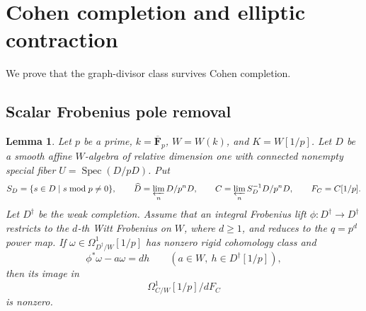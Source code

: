 \documentclass[11pt,a4paper]{amsart}
\numberwithin{equation}{section}
\newtheorem{lemma}[theorem]{Lemma}
\theoremstyle{definition}
\theoremstyle{remark}
\newcommand{\DtwoFF}{\mathbf{F}}
\newcommand{\Dtwowh}{\widehat}
\newcommand{\DtwoSpec}{\operatorname{Spec}}
\begin{document}
\section{Cohen completion and elliptic contraction}\label{d2:sec:cohen}

We prove that the graph-divisor class survives Cohen completion.

\subsection{Scalar Frobenius pole removal}

\begin{lemma}\label{d2:lem:scalar}
Let \(p\) be a prime, \(k=\overline{\DtwoFF}_p\), \(W=W(k)\), and
\(K=W[1/p]\).
Let \(D\) be a smooth affine \(W\)-algebra of relative dimension one
with connected nonempty special fiber \(U=\DtwoSpec(D/pD)\).
Put
\[
 S_D=\{s\in D\mid s\bmod p\ne0\},\qquad
 \Dtwowh D=\varprojlim_nD/p^nD,\qquad
 C=\varprojlim_nS_D^{-1}D/p^nD,\qquad F_C=C[1/p].
\]
Let \(D^\dagger\) be the weak completion.
Assume that an integral Frobenius lift
\(\phi\colon D^\dagger\to D^\dagger\) restricts to the \(d\)-th Witt
Frobenius on \(W\), where \(d\ge1\), and reduces to the
\(q=p^d\) power map.
If \(\omega\in\Omega^1_{D^\dagger/W}[1/p]\) has nonzero rigid
cohomology class and
\[
 \phi^*\omega-a\omega=dh
 \qquad(a\in W,\ h\in D^\dagger[1/p]),
\]
then its image in
\[
 \Omega^1_{C/W}[1/p]\big/dF_C
\]
is nonzero.
\end{lemma}
\end{document}
